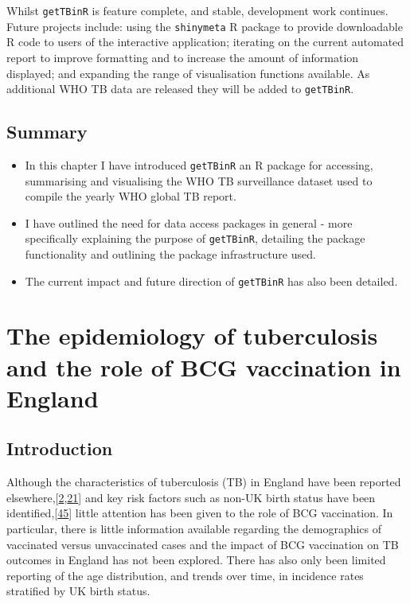 \documentclass[11pt,twoside]{bristolthesis}
\begin{document}
  Whilst \texttt{getTBinR} is feature complete, and stable, development work continues. Future projects include: using the \texttt{shinymeta} R package to provide downloadable R code to users of the interactive application; iterating on the current automated report to improve formatting and to increase the amount of information displayed; and expanding the range of visualisation functions available. As additional WHO TB data are released they will be added to \texttt{getTBinR}.
  
  \hypertarget{summary-2}{%
  \section{Summary}\label{summary-2}}
  \begin{itemize}
  \item
    In this chapter I have introduced \texttt{getTBinR} an R package for accessing, summarising and visualising the WHO TB surveillance dataset used to compile the yearly WHO global TB report.
  \item
    I have outlined the need for data access packages in general - more specifically explaining the purpose of \texttt{getTBinR}, detailing the package functionality and outlining the package infrastructure used.
  \item
    The current impact and future direction of \texttt{getTBinR} has also been detailed.
  \end{itemize}
  \hypertarget{data}{%
  \chapter{The epidemiology of tuberculosis and the role of BCG vaccination in England}\label{data}}
  
  \hypertarget{introduction-2}{%
  \section{Introduction}\label{introduction-2}}
  
  Although the characteristics of tuberculosis (TB) in England have been reported elsewhere,{[}\protect\hyperlink{ref-PHE2017}{2},\protect\hyperlink{ref-PHE2018}{21}{]} and key risk factors such as non-UK birth status have been identified,{[}\protect\hyperlink{ref-French2007}{45}{]} little attention has been given to the role of BCG vaccination. In particular, there is little information available regarding the demographics of vaccinated versus unvaccinated cases and the impact of BCG vaccination on TB outcomes in England has not been explored. There has also only been limited reporting of the age distribution, and trends over time, in incidence rates stratified by UK birth status.
  
\end{document}
